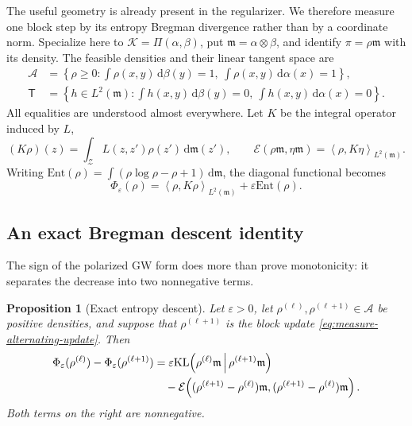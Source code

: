 \documentclass[11pt]{article}
\newtheorem{proposition}[theorem]{Proposition}
\theoremstyle{definition}
\theoremstyle{remark}
\newcommand{\Kcal}{\mathcal K}
\newcommand{\Ee}{\mathcal E}
\newcommand{\dd}{\,\mathrm d}
\newcommand{\eps}{\varepsilon}
\newcommand{\KL}{\mathrm{KL}}
\newcommand{\Ent}{\mathrm{Ent}}
\newcommand{\ip}[2]{\left\langle #1,#2\right\rangle}
\begin{document}
The useful geometry is already present in the regularizer.  We therefore
measure one block step by its entropy Bregman divergence rather than by a
coordinate norm.  Specialize here to
\(\Kcal=\Pi(\alpha,\beta)\), put
\(\mathfrak m=\alpha\otimes\beta\), and identify
\(\pi=\rho\mathfrak m\) with its density.  The feasible densities and their
linear tangent space are
\begin{align}
 \mathcal A
 &=
 \left\{
 \rho\geq0:
 \int\rho(x,y)\dd\beta(y)=1,\ 
 \int\rho(x,y)\dd\alpha(x)=1
 \right\},
 \label{eq:feasible-coupling-densities}\\
 \mathsf T
 &=
 \left\{
 h\in L^2(\mathfrak m):
 \int h(x,y)\dd\beta(y)=0,\ 
 \int h(x,y)\dd\alpha(x)=0
 \right\}.
 \label{eq:coupling-density-tangent}
\end{align}
All equalities are understood almost everywhere.  Let \(K\) be the integral
operator induced by \(L\),
\begin{equation}\label{eq:gw-integral-operator}
 (K\rho)(z)=\int_{\mathcal Z}L(z,z')\rho(z')\dd\mathfrak m(z'),
 \qquad
 \Ee(\rho\mathfrak m,\eta\mathfrak m)
 =\ip{\rho}{K\eta}_{L^2(\mathfrak m)}.
\end{equation}
Writing
\(\Ent(\rho)=\int(\rho\log\rho-\rho+1)\dd\mathfrak m\), the diagonal
functional becomes
\begin{equation}\label{eq:entropic-gw-density-functional}
 \Phi_\eps(\rho)
 =
 \ip{\rho}{K\rho}_{L^2(\mathfrak m)}
 +\eps\Ent(\rho).
\end{equation}

\subsection{An exact Bregman descent identity}

The sign of the polarized GW form does more than prove monotonicity: it
separates the decrease into two nonnegative terms.

\begin{proposition}[Exact entropy descent]
\label{prop:exact-entropy-descent}
Let \(\eps>0\), let \(\rho^{(\ell)},\rho^{(\ell+1)}\in\mathcal A\) be
positive densities, and suppose that \(\rho^{(\ell+1)}\) is the block update
\eqref{eq:measure-alternating-update}.  Then
\begin{align}
 \Phi_\eps(\rho^{(\ell)})-\Phi_\eps(\rho^{(\ell+1)})
 &=
 \eps\KL\!\left(
   \rho^{(\ell)}\mathfrak m
   \,\middle|\,
   \rho^{(\ell+1)}\mathfrak m
 \right)
 \notag\\
 &\quad
 -\Ee\!\left(
   (\rho^{(\ell+1)}-\rho^{(\ell)})\mathfrak m,
   (\rho^{(\ell+1)}-\rho^{(\ell)})\mathfrak m
 \right).
 \label{eq:exact-entropic-gw-descent}
\end{align}
Both terms on the right are nonnegative.
\end{proposition}
\end{document}
